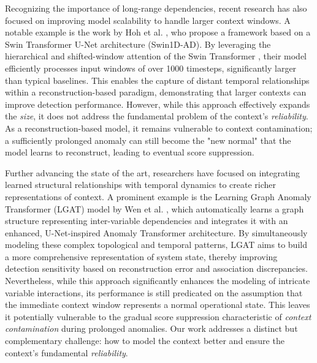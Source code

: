\documentclass[journal]{IEEEtran}
\begin{document}
Recognizing the importance of long-range dependencies, recent research has also focused on improving model scalability to handle larger context windows. A notable example is the work by Hoh et al. \cite{hoh2025rethinking}, who propose a framework based on a Swin Transformer U-Net architecture (Swin1D-AD). By leveraging the hierarchical and shifted-window attention of the Swin Transformer \cite{he2022swin}, their model efficiently processes input windows of over 1000 timesteps, significantly larger than typical baselines. This enables the capture of distant temporal relationships within a reconstruction-based paradigm, demonstrating that larger contexts can improve detection performance. However, while this approach effectively expands the \textit{size}, it does not address the fundamental problem of the context's \textit{reliability}. As a reconstruction-based model, it remains vulnerable to context contamination; a sufficiently prolonged anomaly can still become the "new normal" that the model learns to reconstruct, leading to eventual score suppression.

Further advancing the state of the art, researchers have focused on integrating learned structural relationships with temporal dynamics to create richer representations of context. A prominent example is the Learning Graph Anomaly Transformer (LGAT) model by Wen et al. \cite{wen2025lgat}, which automatically learns a graph structure representing inter-variable dependencies and integrates it with an enhanced, U-Net-inspired Anomaly Transformer architecture. By simultaneously modeling these complex topological and temporal patterns, LGAT aims to build a more comprehensive representation of system state, thereby improving detection sensitivity based on reconstruction error and association discrepancies. Nevertheless, while this approach significantly enhances the modeling of intricate variable interactions, its performance is still predicated on the assumption that the immediate context window represents a normal operational state. This leaves it potentially vulnerable to the gradual score suppression characteristic of \textit{context contamination} during prolonged anomalies. Our work addresses a distinct but complementary challenge: how to model the context better and ensure the context's fundamental \textit{reliability}.
\end{document}
